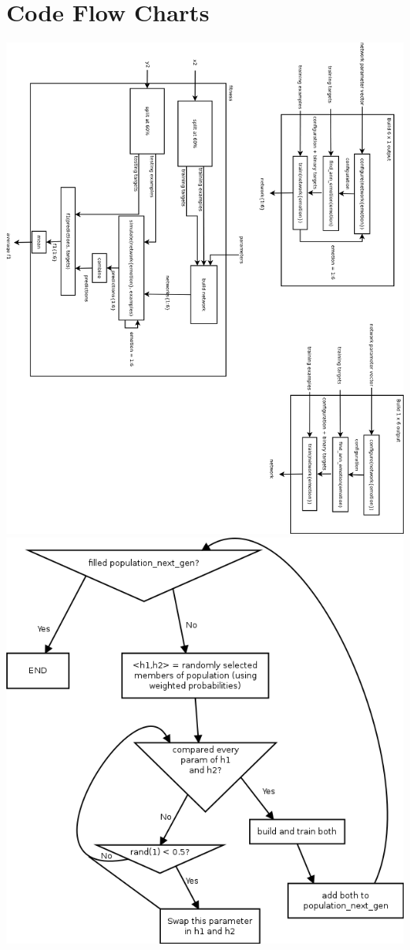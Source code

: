 \documentclass[11pt]{article}
\begin{document}
\section{Code Flow Charts}

\includegraphics[width=\linewidth]{build_networks.png}
\includegraphics[width=\linewidth]{crossover.png}
\end{document}
